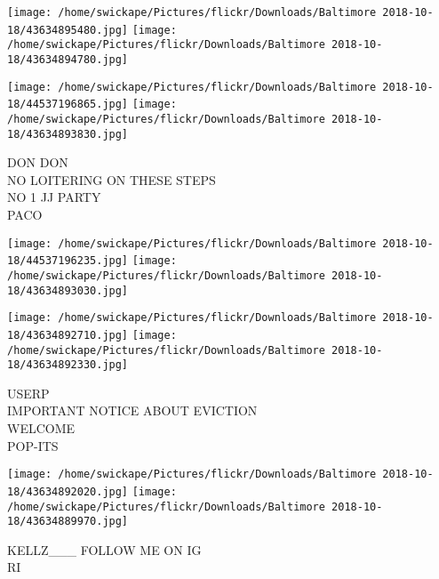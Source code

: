\documentclass[10pt,letterpaper]{article}
\begin{document}
\texttt{[image: /home/swickape/Pictures/flickr/Downloads/Baltimore 2018-10-18/43634895480.jpg]}
\texttt{[image: /home/swickape/Pictures/flickr/Downloads/Baltimore 2018-10-18/43634894780.jpg]}

\texttt{[image: /home/swickape/Pictures/flickr/Downloads/Baltimore 2018-10-18/44537196865.jpg]}
\texttt{[image: /home/swickape/Pictures/flickr/Downloads/Baltimore 2018-10-18/43634893830.jpg]}

DON DON\\
NO LOITERING ON THESE STEPS\\
NO 1 JJ PARTY\\
PACO\\
\pagebreak

\texttt{[image: /home/swickape/Pictures/flickr/Downloads/Baltimore 2018-10-18/44537196235.jpg]}
\texttt{[image: /home/swickape/Pictures/flickr/Downloads/Baltimore 2018-10-18/43634893030.jpg]}

\texttt{[image: /home/swickape/Pictures/flickr/Downloads/Baltimore 2018-10-18/43634892710.jpg]}
\texttt{[image: /home/swickape/Pictures/flickr/Downloads/Baltimore 2018-10-18/43634892330.jpg]}

USERP\\
IMPORTANT NOTICE ABOUT EVICTION\\
WELCOME\\
POP{-}ITS\\
\pagebreak

\texttt{[image: /home/swickape/Pictures/flickr/Downloads/Baltimore 2018-10-18/43634892020.jpg]}
\texttt{[image: /home/swickape/Pictures/flickr/Downloads/Baltimore 2018-10-18/43634889970.jpg]}

KELLZ\_\_\_ FOLLOW ME ON IG\\
RI\\
\pagebreak
\end{document}
